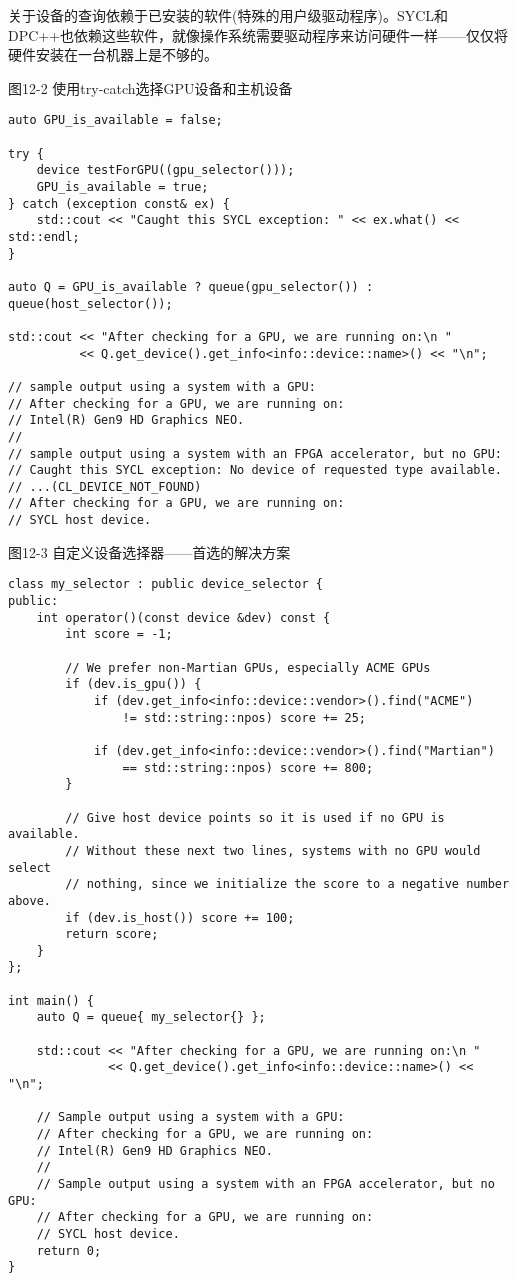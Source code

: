 \begin{tcolorbox}[colback=red!5!white,colframe=red!75!black]
关于设备的查询依赖于已安装的软件(特殊的用户级驱动程序)。SYCL和DPC++也依赖这些软件，就像操作系统需要驱动程序来访问硬件一样——仅仅将硬件安装在一台机器上是不够的。
\end{tcolorbox}

\hspace*{\fill} \par %
图12-2 使用try-catch选择GPU设备和主机设备
\begin{lstlisting}[caption={}]
auto GPU_is_available = false;

try {
	device testForGPU((gpu_selector()));
	GPU_is_available = true;
} catch (exception const& ex) {
	std::cout << "Caught this SYCL exception: " << ex.what() << std::endl;
}

auto Q = GPU_is_available ? queue(gpu_selector()) : queue(host_selector());

std::cout << "After checking for a GPU, we are running on:\n "
	  	  << Q.get_device().get_info<info::device::name>() << "\n";

// sample output using a system with a GPU:
// After checking for a GPU, we are running on:
// Intel(R) Gen9 HD Graphics NEO.
// 
// sample output using a system with an FPGA accelerator, but no GPU:
// Caught this SYCL exception: No device of requested type available.
// ...(CL_DEVICE_NOT_FOUND)
// After checking for a GPU, we are running on:
// SYCL host device.
\end{lstlisting}

\hspace*{\fill} \par %
图12-3 自定义设备选择器——首选的解决方案
\begin{lstlisting}[caption={}]
class my_selector : public device_selector {
public:
	int operator()(const device &dev) const {
		int score = -1;
		
		// We prefer non-Martian GPUs, especially ACME GPUs
		if (dev.is_gpu()) {
			if (dev.get_info<info::device::vendor>().find("ACME")
				!= std::string::npos) score += 25;
			
			if (dev.get_info<info::device::vendor>().find("Martian")
				== std::string::npos) score += 800;
		}
	
		// Give host device points so it is used if no GPU is available.
		// Without these next two lines, systems with no GPU would select
		// nothing, since we initialize the score to a negative number above.
		if (dev.is_host()) score += 100;
		return score;
	}
};

int main() {
	auto Q = queue{ my_selector{} };
	
	std::cout << "After checking for a GPU, we are running on:\n "
			  << Q.get_device().get_info<info::device::name>() << "\n";
			  
	// Sample output using a system with a GPU:
	// After checking for a GPU, we are running on:
	// Intel(R) Gen9 HD Graphics NEO.
	// 
	// Sample output using a system with an FPGA accelerator, but no GPU:
	// After checking for a GPU, we are running on:
	// SYCL host device.
	return 0;
}
\end{lstlisting}

